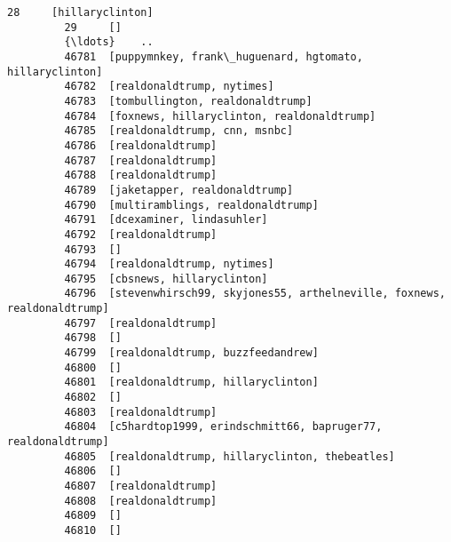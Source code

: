 \documentclass[11pt]{article}
\begin{document}
\begin{Verbatim}[commandchars=\\\{\}]
         28     [hillaryclinton]                                                         
         29     []                                                                       
         {\ldots}    ..                                                                       
         46781  [puppymnkey, frank\_huguenard, hgtomato, hillaryclinton]                  
         46782  [realdonaldtrump, nytimes]                                               
         46783  [tombullington, realdonaldtrump]                                         
         46784  [foxnews, hillaryclinton, realdonaldtrump]                               
         46785  [realdonaldtrump, cnn, msnbc]                                            
         46786  [realdonaldtrump]                                                        
         46787  [realdonaldtrump]                                                        
         46788  [realdonaldtrump]                                                        
         46789  [jaketapper, realdonaldtrump]                                            
         46790  [multiramblings, realdonaldtrump]                                        
         46791  [dcexaminer, lindasuhler]                                                
         46792  [realdonaldtrump]                                                        
         46793  []                                                                       
         46794  [realdonaldtrump, nytimes]                                               
         46795  [cbsnews, hillaryclinton]                                                
         46796  [stevenwhirsch99, skyjones55, arthelneville, foxnews, realdonaldtrump]   
         46797  [realdonaldtrump]                                                        
         46798  []                                                                       
         46799  [realdonaldtrump, buzzfeedandrew]                                        
         46800  []                                                                       
         46801  [realdonaldtrump, hillaryclinton]                                        
         46802  []                                                                       
         46803  [realdonaldtrump]                                                        
         46804  [c5hardtop1999, erindschmitt66, bapruger77, realdonaldtrump]             
         46805  [realdonaldtrump, hillaryclinton, thebeatles]                            
         46806  []                                                                       
         46807  [realdonaldtrump]                                                        
         46808  [realdonaldtrump]                                                        
         46809  []                                                                       
         46810  []                                                                       
         

\end{Verbatim}
\end{document}
